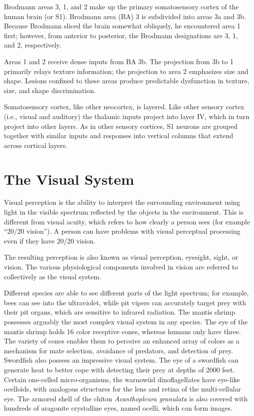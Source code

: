 Brodmann areas 3, 1, and 2 make up the primary somatosensory cortex of the human brain (or S1). Brodmann area (BA) 3 is subdivided into areas 3a and 3b. Because Brodmann sliced the brain somewhat obliquely, he encountered area 1 first; however, from anterior to posterior, the Brodmann designations are 3, 1, and 2, respectively.

Areas 1 and 2 receive dense inputs from BA 3b. The projection from 3b to 1 primarily relays texture information; the projection to area 2 emphasizes size and shape. Lesions confined to these areas produce predictable dysfunction in texture, size, and shape discrimination.

Somatosensory cortex, like other neocortex, is layered. Like other sensory cortex (i.e., visual and auditory) the thalamic inputs project into layer IV, which in turn project into other layers. As in other sensory cortices, S1 neurons are grouped together with similar inputs and responses into vertical columns that extend across cortical layers.

\hypertarget{the-visual-system}{%
\chapter{The Visual System}\label{the-visual-system}}

Visual perception is the ability to interpret the surrounding environment using light in the visible spectrum reflected by the objects in the environment. This is different from visual acuity, which refers to how clearly a person sees (for example ``20/20 vision''). A person can have problems with visual perceptual processing even if they have 20/20 vision.

The resulting perception is also known as visual perception, eyesight, sight, or vision. The various physiological components involved in vision are referred to collectively as the visual system.

Different species are able to see different parts of the light spectrum; for example, bees can see into the ultraviolet, while pit vipers can accurately target prey with their pit organs, which are sensitive to infrared radiation. The mantis shrimp possesses arguably the most complex visual system in any species. The eye of the mantis shrimp holds 16 color receptive cones, whereas humans only have three. The variety of cones enables them to perceive an enhanced array of colors as a mechanism for mate selection, avoidance of predators, and detection of prey. Swordfish also possess an impressive visual system. The eye of a swordfish can generate heat to better cope with detecting their prey at depths of 2000 feet. Certain one-celled micro-organisms, the warnowiid dinoflagellates have eye-like ocelloids, with analogous structures for the lens and retina of the multi-cellular eye. The armored shell of the chiton \emph{Acanthopleura granulata} is also covered with hundreds of aragonite crystalline eyes, named ocelli, which can form images.

